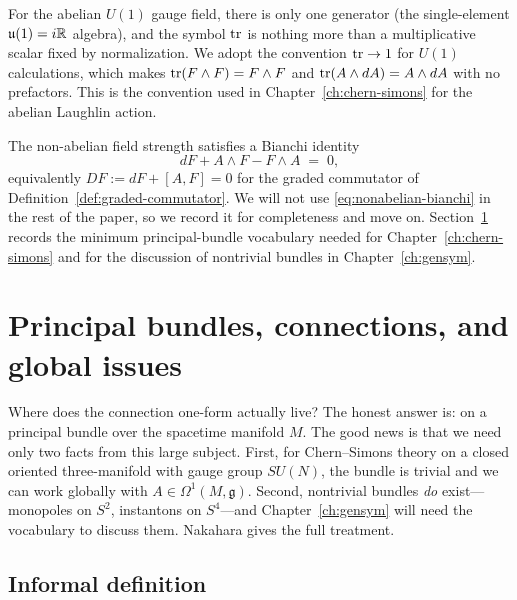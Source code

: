 \begin{remark}[Abelian $\tr$]\label{rem:abelian-trace}
For the abelian $U(1)$ gauge field, there is only one generator (the single-element $\mathfrak{u}(1) = i\mathbb{R}$ algebra), and the symbol $\tr$ is nothing more than a multiplicative scalar fixed by normalization. We adopt the convention $\operatorname{tr} \to 1$ for $U(1)$ calculations, which makes $\operatorname{tr}(F \wedge F) = F \wedge F$ and $\operatorname{tr}(A \wedge dA) = A \wedge dA$ with no prefactors. This is the convention used in Chapter~\ref{ch:chern-simons} for the abelian Laughlin action.
\end{remark}

\medskip

\noindent The non-abelian field strength satisfies a Bianchi identity
\begin{equation}\label{eq:nonabelian-bianchi}
dF + A \wedge F - F \wedge A \;=\; 0,
\end{equation}
equivalently $DF := dF + [A, F] = 0$ for the graded commutator of Definition~\ref{def:graded-commutator}. We will not use \eqref{eq:nonabelian-bianchi} in the rest of the paper, so we record it for completeness and move on. Section~\ref{sec:principal-bundles} records the minimum principal-bundle vocabulary needed for Chapter~\ref{ch:chern-simons} and for the discussion of nontrivial bundles in Chapter~\ref{ch:gensym}.


\section{Principal bundles, connections, and global issues}\label{sec:principal-bundles}

Where does the connection one-form actually live? The honest answer is: on a principal bundle over the spacetime manifold $M$. The good news is that we need only two facts from this large subject. First, for Chern--Simons theory on a closed oriented three-manifold with gauge group $SU(N)$, the bundle is trivial and we can work globally with $A \in \Omega^1(M, \mathfrak{g})$. Second, nontrivial bundles \emph{do} exist---monopoles on $S^2$, instantons on $S^4$---and Chapter~\ref{ch:gensym} will need the vocabulary to discuss them. Nakahara \cite{Nakahara2003GTP} gives the full treatment.

\subsection{Informal definition}\label{sec:principal-bundle-def}

